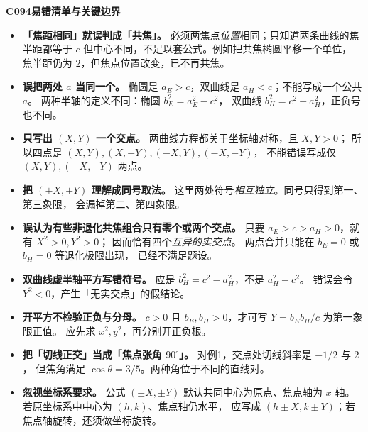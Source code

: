 \clearpage
\begin{trapbox}
\textbf{C094\quad 易错清单与关键边界}
\begin{itemize}
\item \textbf{「焦距相同」就误判成「共焦」。}
必须两焦点\emph{位置}相同；只知道两条曲线的焦半距都等于 $c$
但中心不同，不足以套公式。例如把共焦椭圆平移一个单位，
焦半距仍为 $2$，但焦点位置改变，已不再共焦。

\item \textbf{误把两处 $a$ 当同一个。}
椭圆是 $a_E>c$，双曲线是 $a_H<c$；不能写成一个公共 $a$。
两种半轴的定义不同：椭圆 $b_E^2=a_E^2-c^2$，
双曲线 $b_H^2=c^2-a_H^2$，正负号也不同。

\item \textbf{只写出 $(X,Y)$ 一个交点。}
两曲线方程都关于坐标轴对称，且 $X,Y>0$；
所以四点是 $(X,Y),(X,-Y),(-X,Y),(-X,-Y)$，
不能错误写成仅 $(X,Y),(-X,-Y)$ 两点。

\item \textbf{把 $(\pm X,\pm Y)$ 理解成同号取法。}
这里两处符号\emph{相互独立}。同号只得到第一、第三象限，
会漏掉第二、第四象限。

\item \textbf{误认为有些非退化共焦组合只有零个或两个交点。}
只要 $a_E>c>a_H>0$，就有 $X^2>0,Y^2>0$；
因而恰有四个\emph{互异的实交点}。
两点合并只能在 $b_E=0$ 或 $b_H=0$ 等退化极限出现，
已经不满足题设。

\item \textbf{双曲线虚半轴平方写错符号。}
应是 $b_H^2=c^2-a_H^2$，不是 $a_H^2-c^2$。
错误会令 $Y^2<0$，产生「无实交点」的假结论。

\item \textbf{开平方不检验正负与分母。}
$c>0$ 且 $b_E,b_H>0$，才可写 $Y=b_Eb_H/c$ 为第一象限正值。
应先求 $x^2,y^2$，再分别开正负根。

\item \textbf{把「切线正交」当成「焦点张角 $90^\circ$」。}
对例1，交点处切线斜率是 $-1/2$ 与 $2$，
但焦角满足 $\cos\theta=3/5$。两种角位于不同的直线对。

\item \textbf{忽视坐标系要求。}
公式 $(\pm X,\pm Y)$ 默认共同中心为原点、焦点轴为 $x$ 轴。
若原坐标系中中心为 $(h,k)$、焦点轴仍水平，
应写成 $(h\pm X,k\pm Y)$；若焦点轴旋转，还须做坐标旋转。
\end{itemize}
\end{trapbox}

